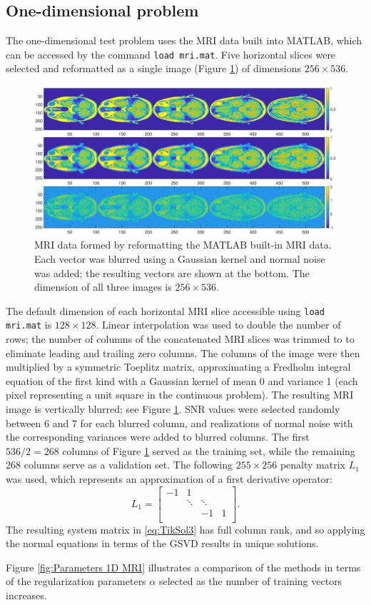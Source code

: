 \documentclass[12pt]{article}
\newcommand{\regparam}{\alpha}  %
\begin{document}
\subsection{One-dimensional problem} \label{sec:1D}
The one-dimensional test problem uses the MRI data built into MATLAB, which can be accessed by the command \texttt{load mri.mat}. Five horizontal slices were selected and reformatted as a single image (Figure \ref{fig:MRI 1D}) of dimensions $256 \times 536$. 
\begin{figure}[ht]
\includegraphics[scale=0.32]{Figures/Full_MRI_Data.eps}
\caption{MRI data formed by reformatting the MATLAB built-in MRI data. Each vector was blurred using a Gaussian kernel and normal noise was added; the resulting vectors are shown at the bottom. The dimension of all three images is $256 \times 536$.}
\label{fig:MRI 1D}
\end{figure}
The default dimension of each horizontal MRI slice accessible using \texttt{load mri.mat} is $128 \times 128$. Linear interpolation was used to double the number of rows; the number of columns of the concatenated MRI slices was trimmed to to eliminate leading and trailing zero columns. The columns of the image were then multiplied by a symmetric Toeplitz matrix, approximating a Fredholm integral equation of the first kind with a Gaussian kernel of mean 0 and variance 1 (each pixel representing a unit square in the continuous problem). The resulting MRI image is vertically blurred; see Figure \ref{fig:MRI 1D}. SNR values were selected randomly between 6 and 7 for each blurred column, and realizations of normal noise with the corresponding variances were added to blurred columns. The first $536/2 = 268$ columns of Figure \ref{fig:MRI 1D} served as the training set, while the remaining 268 columns serve as a validation set.  The following $255 \times 256$ penalty matrix $L_1$ was used, which represents an approximation of a first derivative operator:
\[L_1 = \begin{bmatrix}
-1 & 1 & &  \\
 & \ddots &  \ddots & \\
 & & -1 & 1 \\
\end{bmatrix}.\]
The resulting system matrix in \eqref{eq:TikSol3} has full column rank, and so applying the normal equations in terms of the GSVD results in unique solutions. \par 
Figure \ref{fig:Parameters 1D MRI} illustrates a comparison of the methods in terms of the regularization parameters $\regparam$ selected as the number of training vectors increases. 
\end{document}
